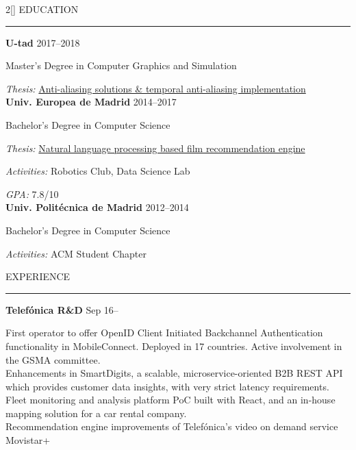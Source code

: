 \documentclass[a4paper, 12pt]{article}
\newenvironment{myparacol}[2][]{%
\begin{paracol}{#2}[#1]\setlength{\parindent}{0pt}}{%
\end{paracol}}
\begin{document}
\setlength{\columnsep}{24pt}
\begin{sloppypar}
\begin{myparacol}{2}
    EDUCATION
    \vspace{1mm}
    \hrule
    \kern9pt
    \textbf{U-tad} \hfill 2017--2018

    Master's Degree in Computer Graphics and Simulation

    \textit{Thesis:} \href{https://github.com/hugo19941994/temporal-aa-doc/raw/master/thesis.pdf}{Anti-aliasing solutions \& temporal anti-aliasing implementation}\\

    \textbf{Univ. Europea de Madrid} \hfill 2014--2017

    Bachelor's Degree in Computer Science

    \textit{Thesis:} \href{https://github.com/hugo19941994/movie-pepper-doc/raw/master/thesis.pdf}{Natural language processing based film recommendation engine}

    \textit{Activities:} Robotics Club, Data Science Lab

    \textit{GPA:} 7.8/10\\

    \textbf{Univ. Politécnica de Madrid} \hfill 2012--2014

    Bachelor's Degree in Computer Science

    \textit{Activities:} ACM Student Chapter
    \\

    \switchcolumn{}

    EXPERIENCE
    \vspace{1mm}
    \hrule
    \kern9pt

    \textbf{Telefónica R\&D} \hfill Sep 16--

    First operator to offer OpenID Client Initiated Backchannel Authentication functionality in MobileConnect. Deployed in 17 countries. Active involvement in the GSMA committee\@.\\

    Enhancements in SmartDigits, a scalable,  microservice-oriented B2B REST API which provides customer data insights, with very strict latency requirements.\\

    Fleet monitoring and analysis platform PoC built with React, and an in-house mapping solution for a car rental company.\\

    Recommendation engine improvements of Telefónica's video on demand service Movistar+\\


\end{myparacol}
\end{sloppypar}
\end{document}
